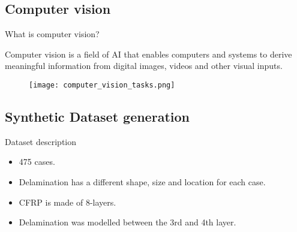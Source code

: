 \documentclass[10pt,aspectratio=169]{beamer} %
\begin{document}
\subsection{Computer vision}
\setcounter{subfigure}{0}
\begin{frame}{What is computer vision?}
	\begin{minipage}[c]{0.30\textwidth}
		Computer vision is a field of AI that enables computers and systems to derive meaningful information from digital images, videos and other visual inputs. 
	\end{minipage}
	\hfill
	\begin{minipage}[c]{0.65\textwidth}
		\begin{figure}
			\centering
			\texttt{[image: computer\_vision\_tasks.png]}
		\end{figure}
	\end{minipage}
\end{frame}
\subsection{Synthetic Dataset generation}
\setcounter{subfigure}{0}
\begin{frame}{Dataset description}
	\centering
	\begin{minipage}[c]{0.35\textwidth}
		\begin{itemize}
			\justifying
			\item 475 cases.
			\item Delamination has a different shape, size and location for each case.
			\item CFRP is made of 8-layers.
			\item Delamination was modelled between the 3rd and 4th layer.			
		\end{itemize}
	\end{minipage}
	\begin{minipage}[c]{0.6\textwidth}
		\begin{figure}
			\centering			
			\qquad
		\end{figure}
	\end{minipage}
\end{frame}
\end{document}
